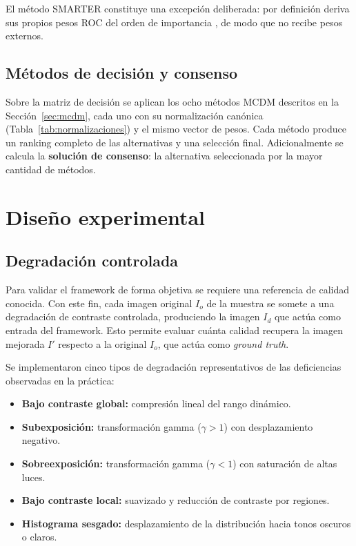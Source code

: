 El método SMARTER constituye una excepción deliberada: por definición deriva sus propios pesos ROC del orden de importancia \citep{Edwards1994}, de modo que no recibe pesos externos.

\subsection{Métodos de decisión y consenso}

Sobre la matriz de decisión se aplican los ocho métodos MCDM descritos en la Sección~\ref{sec:mcdm}, cada uno con su normalización canónica (Tabla~\ref{tab:normalizaciones}) y el mismo vector de pesos. Cada método produce un ranking completo de las alternativas y una selección final. Adicionalmente se calcula la \textbf{solución de consenso}: la alternativa seleccionada por la mayor cantidad de métodos.

\section{Diseño experimental}
\label{sec:diseno_experimental}

\subsection{Degradación controlada}
\label{sec:degradacion}

Para validar el framework de forma objetiva se requiere una referencia de calidad conocida. Con este fin, cada imagen original $I_o$ de la muestra se somete a una degradación de contraste controlada, produciendo la imagen $I_d$ que actúa como entrada del framework. Esto permite evaluar cuánta calidad recupera la imagen mejorada $I'$ respecto a la original $I_o$, que actúa como \textit{ground truth}.

Se implementaron cinco tipos de degradación representativos de las deficiencias observadas en la práctica:

\begin{itemize}
    \item \textbf{Bajo contraste global:} compresión lineal del rango dinámico.
    \item \textbf{Subexposición:} transformación gamma ($\gamma > 1$) con desplazamiento negativo.
    \item \textbf{Sobreexposición:} transformación gamma ($\gamma < 1$) con saturación de altas luces.
    \item \textbf{Bajo contraste local:} suavizado y reducción de contraste por regiones.
    \item \textbf{Histograma sesgado:} desplazamiento de la distribución hacia tonos oscuros o claros.
\end{itemize}

